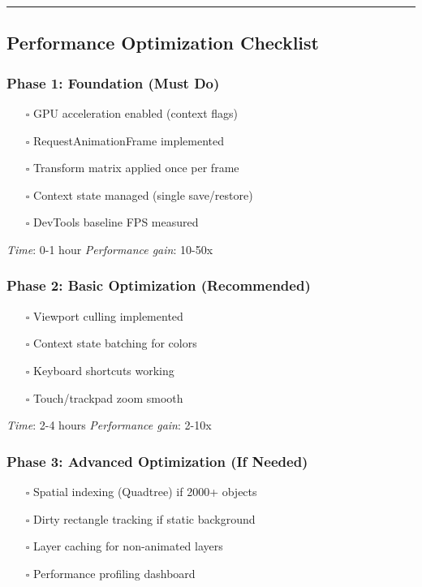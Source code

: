 \documentclass[11pt]{article}
\begin{document}
\noindent\rule{\textwidth}{0.5pt}
\subsection{Performance Optimization Checklist}
\label{sec:org0527d3d}

\subsubsection{Phase 1: Foundation (Must Do)}
\label{sec:org1ecf28e}
\begin{itemize}
\item[{$\square$}] GPU acceleration enabled (context flags)
\item[{$\square$}] RequestAnimationFrame implemented
\item[{$\square$}] Transform matrix applied once per frame
\item[{$\square$}] Context state managed (single save/restore)
\item[{$\square$}] DevTools baseline FPS measured
\end{itemize}

\emph{Time}: 0-1 hour
\emph{Performance gain}: 10-50x
\subsubsection{Phase 2: Basic Optimization (Recommended)}
\label{sec:orgb2e8ec6}
\begin{itemize}
\item[{$\square$}] Viewport culling implemented
\item[{$\square$}] Context state batching for colors
\item[{$\square$}] Keyboard shortcuts working
\item[{$\square$}] Touch/trackpad zoom smooth
\end{itemize}

\emph{Time}: 2-4 hours
\emph{Performance gain}: 2-10x
\subsubsection{Phase 3: Advanced Optimization (If Needed)}
\label{sec:org222a36c}
\begin{itemize}
\item[{$\square$}] Spatial indexing (Quadtree) if 2000+ objects
\item[{$\square$}] Dirty rectangle tracking if static background
\item[{$\square$}] Layer caching for non-animated layers
\item[{$\square$}] Performance profiling dashboard
\end{itemize}
\end{document}
